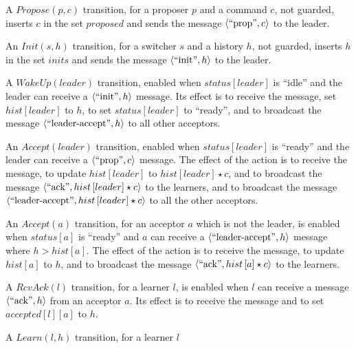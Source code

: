 \begin{compactitem}
    \item A $Propose\left( p,c \right)$ transition, for a proposer $p$
        and a command $c$, not guarded, inserts $c$ in the set
        $proposed$ and sends the message $\left\langle\text{``prop''},c\right\rangle$ to
        the leader.
    \item An $Init\left( s, h \right)$ transition, for a switcher $s$
        and a history $h$, not guarded, inserts $h$ in the set $inits$ and
        sends the message $\left\langle\text{``init''},h\right\rangle$ to the leader.
    \item A $WakeUp\left( leader \right)$ transition, enabled when
        $status\left[ leader \right]$ is ``idle'' and the leader can
        receive a $\left\langle\text{``init''},h\right\rangle$ message. Its effect is to
        receive the message, set $hist\left[ leader \right]$ to $h$,
        to set $status\left[ leader \right]$ to ``ready'', and to
        broadcast the message $\left\langle\text{``leader-accept''},h\right\rangle$ to all
        other acceptors.
    \item An $Accept\left( leader \right)$ transition, enabled when
        $status\left[ leader \right]$ is ``ready'' and the leader can
        receive a $\left\langle\text{``prop''},c\right\rangle$ message. The effect of the
        action is to receive the message, to update $hist\left[ leader
        \right]$ to $hist\left[ leader \right]\star c$, and to
        broadcast the message $\left\langle\text{``ack''},hist\left[ leader
        \right]\star c\right\rangle$ to the learners, and to broadcast the message
        $\left\langle\text{``leader-accept''},hist\left[ leader \right]\star c\right\rangle$
        to all the other acceptors.
    \item An $Accept\left( a \right)$ transition, for an acceptor $a$
        which is not the leader, is enabled when $status\left[ a
        \right]$ is ``ready'' and $a$ can receive a
        $\left\langle\text{``leader-accept''},h\right\rangle$ message where $h > hist\left[ a
        \right]$. The effect of the action is to receive the message,
        to update $hist\left[ a \right]$ to $h$, and to broadcast the
        message $\left\langle\text{``ack''},hist\left[ a \right]\star c\right\rangle$ to the
        learners.
    \item A $RcvAck\left( l \right)$ transition, for a learner $l$, is
        enabled when $l$ can receive a message $\left\langle\text{``ack''},h\right\rangle$
        from an acceptor $a$. Its effect is to receive the message and
        to set $accepted\left[ l \right]\left[ a \right]$ to $h$.
    \item A $Learn\left( l, h \right)$ transition, for a learner $l$

\end{compactitem}
